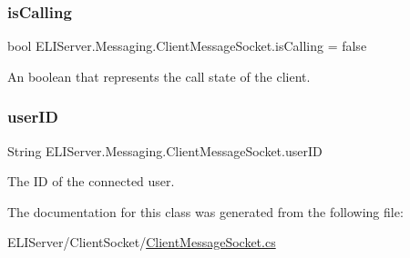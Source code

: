 \subsubsection{\texorpdfstring{is\+Calling}{isCalling}}
{\footnotesize\ttfamily bool E\+L\+I\+Server.\+Messaging.\+Client\+Message\+Socket.\+is\+Calling = false}



An boolean that represents the call state of the client. 

\mbox{\label{class_e_l_i_server_1_1_messaging_1_1_client_message_socket_a133a6eff37e294286e2777799bc644f4}} 
\subsubsection{\texorpdfstring{user\+ID}{userID}}
{\footnotesize\ttfamily String E\+L\+I\+Server.\+Messaging.\+Client\+Message\+Socket.\+user\+ID\hspace{0.3cm}{\ttfamily [private]}}



The ID of the connected user. 



The documentation for this class was generated from the following file\+:\begin{DoxyCompactItemize}
\item 
E\+L\+I\+Server/\+Client\+Socket/\hyperlink{_client_message_socket_8cs}{Client\+Message\+Socket.\+cs}\end{DoxyCompactItemize}
